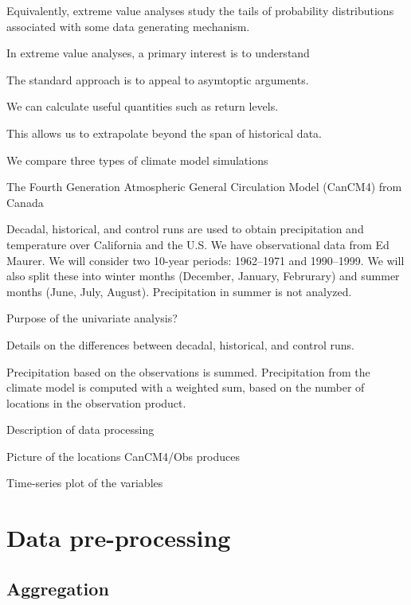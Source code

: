 \documentclass[12pt]{article}
\begin{document}
Equivalently, extreme value analyses study the tails of probability distributions associated with some data generating mechanism. 

In extreme value analyses, a primary interest is to understand 

The standard approach is to appeal to asymtoptic arguments.

We can calculate useful quantities such as return levels.

This allows us to extrapolate beyond the span of historical data.


We compare three types of climate model simulations 

The Fourth Generation Atmospheric General Circulation Model (CanCM4) from Canada 

Decadal, historical, and control runs are used to obtain precipitation and temperature over California and the U.S. We have observational data from Ed Maurer. We will consider two 10-year periods: 1962--1971 and 1990--1999. We will also split these into winter months (December, January, Februrary) and summer months (June, July, August). Precipitation in summer is not analyzed.
\bigskip

Purpose of the univariate analysis?
\bigskip

Details on the differences between decadal, historical, and control runs.
\bigskip

Precipitation based on the observations is summed. Precipitation from the climate model is computed with a weighted sum, based on the number of locations in the observation product.
\bigskip

Description of data processing
\bigskip

Picture of the locations CanCM4/Obs produces
\bigskip

Time-series plot of the variables
\bigskip

\section{Data pre-processing}

\subsection{Aggregation}
\end{document}
